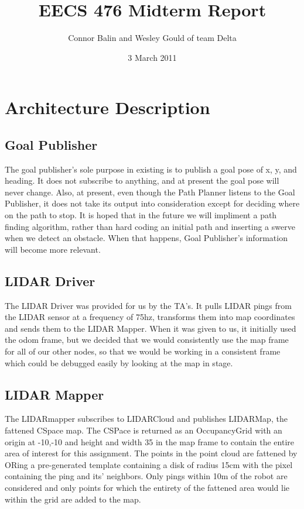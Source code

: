 \documentclass{article}
\author{Connor Balin and Wesley Gould of team Delta}
\title{EECS 476 Midterm Report}
\date{3 March 2011}
\begin{document}
\maketitle

\section{Architecture Description}

\subsection{Goal Publisher}

The goal publisher's sole purpose in existing is to publish a goal pose of x, y, and heading.
It does not subscribe to anything, and at present the goal pose will never change.
Also, at present, even though the Path Planner listens to the Goal Publisher, it does not take its output into consideration except for deciding where on the path to stop.
It is hoped that in the future we will impliment a path finding algorithm, rather than hard coding an initial path and inserting a swerve when we detect an obstacle.
When that happens, Goal Publisher's information will become more relevant.

\subsection{LIDAR Driver}

The LIDAR Driver was provided for us by the TA's.
It pulls LIDAR pings from the LIDAR sensor at a frequency of 75hz, transforms them into map coordinates and sends them to the LIDAR Mapper.
When it was given to us, it initially used the odom frame, but we decided that we would consistently use the map frame for all of our other nodes, so that we would be working in a consistent frame which could be debugged easily by looking at the map in stage.

\subsection{LIDAR Mapper}

The LIDARmapper subscribes to LIDARCloud and publishes LIDARMap, the fattened CSpace map.
The CSPace is returned as an OccupancyGrid with an origin at -10,-10 and height and width 35 in the map frame to contain the entire area of interest for this assignment.
The points in the point cloud are fattened by ORing a pre-generated template containing a disk of radius 15cm with the pixel containing the ping and its' neighbors.
Only pings within 10m of the robot are considered and only points for which the entirety of the fattened area would lie within the grid are added to the map.
\end{document}
